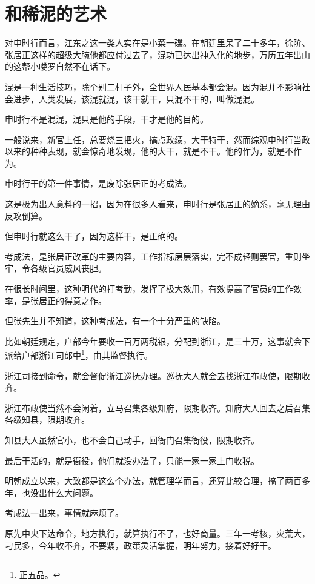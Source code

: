 \section{和稀泥的艺术}
\ifnum{}
	\begin{multicols}{\theparacolNo}
\fi
对申时行而言，江东之这一类人实在是小菜一碟。在朝廷里呆了二十多年，徐阶、张居正这样的超级大腕他都应付过去了，混功已达出神入化的地步，万历五年出山的这帮小喽罗自然不在话下。

混是一种生活技巧，除个别二杆子外，全世界人民基本都会混。因为混并不影响社会进步，人类发展，该混就混，该干就干，只混不干的，叫做混混。

申时行不是混混，混只是他的手段，干才是他的目的。

一般说来，新官上任，总要烧三把火，搞点政绩，大干特干，然而综观申时行当政以来的种种表现，就会惊奇地发现，他的大干，就是不干。他的作为，就是不作为。

申时行干的第一件事情，是废除张居正的考成法。

这是极为出人意料的一招，因为在很多人看来，申时行是张居正的嫡系，毫无理由反攻倒算。

但申时行就这么干了，因为这样干，是正确的。

考成法，是张居正改革的主要内容，工作指标层层落实，完不成轻则罢官，重则坐牢，令各级官员威风丧胆。

在很长时间里，这种明代的打考勤，发挥了极大效用，有效提高了官员的工作效率，是张居正的得意之作。

但张先生并不知道，这种考成法，有一个十分严重的缺陷。

比如朝廷规定，户部今年要收一百万两税银，分配到浙江，是三十万，这事就会下派给户部浙江司郎中\footnote{正五品。}，由其监督执行。

浙江司接到命令，就会督促浙江巡抚办理。巡抚大人就会去找浙江布政使，限期收齐。

浙江布政使当然不会闲着，立马召集各级知府，限期收齐。知府大人回去之后召集各级知县，限期收齐。

知县大人虽然官小，也不会自己动手，回衙门召集衙役，限期收齐。

最后干活的，就是衙役，他们就没办法了，只能一家一家上门收税。

明朝成立以来，大致都是这么个办法，就管理学而言，还算比较合理，搞了两百多年，也没出什么大问题。

考成法一出来，事情就麻烦了。

原先中央下达命令，地方执行，就算执行不了，也好商量。三年一考核，灾荒大，刁民多，今年收不齐，不要紧，政策灵活掌握，明年努力，接着好好干。


\end{multicols}
